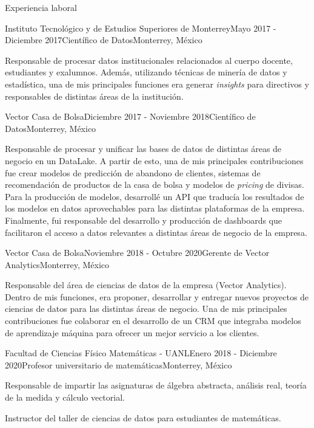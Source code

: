 \documentclass{resume} %
\begin{document}
\begin{rSection}{Experiencia laboral}

\begin{rSubsection}{Instituto Tecnológico y de Estudios Superiores de Monterrey}{Mayo 2017 - Diciembre 2017}{Científico de Datos}{Monterrey, México}
\item Responsable de procesar datos institucionales relacionados al cuerpo docente, estudiantes y exalumnos. Además, utilizando técnicas de minería de datos y estadística, una de mis principales funciones era generar \textit{insights} para directivos y responsables de distintas áreas de la institución.
\end{rSubsection}


\begin{rSubsection}{Vector Casa de Bolsa}{Diciembre 2017 - Noviembre 2018}{Científico de Datos}{Monterrey, México}
\item Responsable de procesar y unificar las bases de datos de distintas áreas de negocio en un DataLake. A partir de esto, una de mis principales contribuciones fue crear modelos de predicción de abandono de clientes, sistemas de recomendación de productos de la casa de bolsa y modelos de \textit{pricing} de divisas. Para la producción de modelos, desarrollé un API que traducía los resultados de los modelos en datos aprovechables para las distintas plataformas de la empresa. Finalmente, fui responsable del desarrollo y producción de dashboards que facilitaron el acceso a datos relevantes a distintas áreas de negocio de la empresa.
\end{rSubsection}



\begin{rSubsection}{Vector Casa de Bolsa}{Noviembre 2018 - Octubre 2020}{Gerente de Vector Analytics}{Monterrey, México}
\item Responsable del área de ciencias de datos de la empresa (Vector Analytics). Dentro de mis funciones, era proponer, desarrollar y entregar nuevos proyectos de ciencias de datos para las distintas áreas de negocio. Una de mis principales contribuciones fue colaborar en el desarrollo de un CRM que integraba modelos de aprendizaje máquina para ofrecer un mejor servicio a los clientes. 
\end{rSubsection}


\begin{rSubsection}{Facultad de Ciencias Físico Matemáticas - UANL}{Enero 2018 - Diciembre 2020}{Profesor universitario de matemáticas}{Monterrey, México}
\item Responsable de impartir las asignaturas de álgebra abstracta, análisis real, teoría de la medida y cálculo vectorial.
\item Instructor del taller de ciencias de datos para estudiantes de matemáticas.
\end{rSubsection}

\end{rSection}
\end{document}
